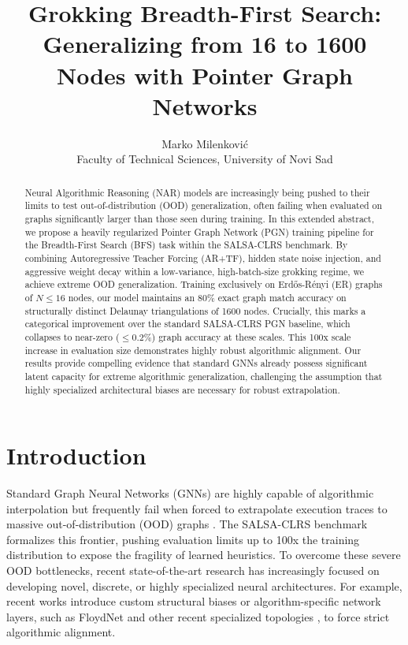 \documentclass{article}
\title{Grokking Breadth-First Search: Generalizing from 16 to 1600 Nodes with Pointer Graph Networks}
\author[M. Milenkovi\'{c}]{%
  Marko Milenkovi\'{c} \\
  Faculty of Technical Sciences, University of Novi Sad\\
  \email{mmarkomile@gmail.com}
}
\begin{document}
\maketitle

\begin{abstract}
Neural Algorithmic Reasoning (NAR) models are increasingly being pushed to their limits to test out-of-distribution (OOD) generalization, often failing when evaluated on graphs significantly larger than those seen during training. In this extended abstract, we propose a heavily regularized Pointer Graph Network (PGN) training pipeline for the Breadth-First Search (BFS) task within the SALSA-CLRS benchmark. By combining Autoregressive Teacher Forcing (AR+TF), hidden state noise injection, and aggressive weight decay within a low-variance, high-batch-size grokking regime, we achieve extreme OOD generalization. Training exclusively on Erd\H{o}s-R\'{e}nyi (ER) graphs of $N \le 16$ nodes, our model maintains an $80\%$ exact graph match accuracy on structurally distinct Delaunay triangulations of 1600 nodes. Crucially, this marks a categorical improvement over the standard SALSA-CLRS PGN baseline, which collapses to near-zero ($\le 0.2\%$) graph accuracy at these scales. This 100x scale increase in evaluation size demonstrates highly robust algorithmic alignment. Our results provide compelling evidence that standard GNNs already possess significant latent capacity for extreme algorithmic generalization, challenging the assumption that highly specialized architectural biases are necessary for robust extrapolation.
\end{abstract}

\section{Introduction}

Standard Graph Neural Networks (GNNs) \cite{velickovic2020pointer} are highly capable of algorithmic interpolation but frequently fail when forced to extrapolate execution traces to massive out-of-distribution (OOD) graphs \cite{velickovic2022clrs}. The SALSA-CLRS benchmark \cite{minder2023salsa} formalizes this frontier, pushing evaluation limits up to 100x the training distribution to expose the fragility of learned heuristics. To overcome these severe OOD bottlenecks, recent state-of-the-art research has increasingly focused on developing novel, discrete, or highly specialized neural architectures. For example, recent works introduce custom structural biases or algorithm-specific network layers, such as FloydNet \cite{floydnet} and other recent specialized topologies \cite{rodionov2025discrete}, to force strict algorithmic alignment. 
\end{document}
